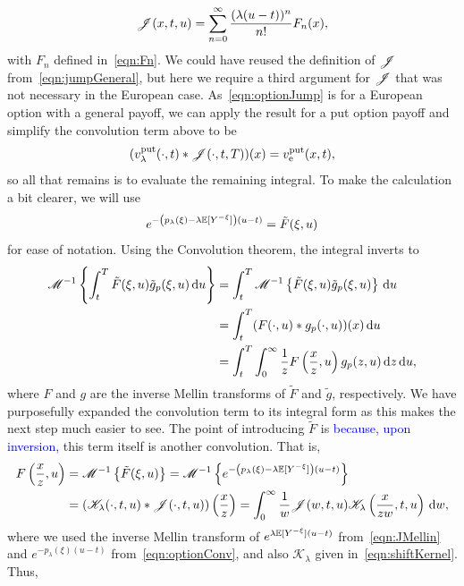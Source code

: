       \begin{equation}
      		\label{eqn:Jnew}
        \mathscr J(x,t,u) = \sum\limits_{n=0}^\infty \frac{(\lambda(u-t))^n}{n!}F_n(x),
      \end{equation}
    with $F_n$ defined in~\eqref{eqn:Fn}. We could have reused the definition of $\mathscr J$ from~\eqref{eqn:jumpGeneral}, but here we require a third argument for $\mathscr J$ that was not necessary in the European case.
    As~\eqref{eqn:optionJump} is for a European option with a general payoff, we can apply the result for a put option payoff and simplify the convolution term above to be
      $$
        (v_\lambda^{\text{put}}(\cdot,t) \ast \mathscr J(\cdot, t, T))(x) = v_{\text{e}}^{\text{put}}(x,t),
      $$
    so all that remains is to evaluate the remaining integral. To make the calculation a bit clearer, we will use
    	$$
    		e^{-\left(p_\lambda(\xi) -\lambda\mathbb E[Y^{-\xi}]\right)(u-t)} = \tilde{F}(\xi,u)
    	$$
    	for ease of notation. Using the Convolution theorem, the integral inverts to
      \begin{align*}
          \mathscr M^{-1}\left\{ \int_t^T \tilde{F}(\xi,u)\tilde{g}_p(\xi,u) \, \mathrm d u \right\} &=
          \int_t^T \mathscr M^{-1}\left\{\tilde{F}(\xi,u)\tilde{g}_p(\xi,u)\right\} \,\mathrm d u \\
          &= \int_t^T (F(\cdot,u)\ast g_p(\cdot,u))(x) \, \mathrm d u \\
          &= \int_t^T \int_0^\infty \frac{1}{z}F\left(\frac{x}{z},u\right)g_p(z,u) \, \mathrm d z \, \mathrm d u,
        \end{align*}
        where $F$ and $g$ are the inverse Mellin transforms of $\tilde F$ and $\tilde g$, respectively. We have purposefully expanded the convolution term to its integral form as this makes the next step much easier to see. The point of introducing $\tilde F$ is \textcolor{blue}{because, upon inversion,} this term itself is another convolution. That is,
        \begin{align*}
        	F\left(\frac{x}{z},u\right) &= \mathscr M^{-1}\left\{\tilde{F}(\xi,u)\right\} = \mathscr M^{-1}\left\{e^{-\left(p_\lambda(\xi) -\lambda\mathbb E[Y^{-\xi}]\right)(u-t)}\right\} \\
        	&= (\mathscr K_\lambda(\cdot,t,u)\ast \mathscr J(\cdot,t,u))\left(\frac{x}{z}\right) = \int_0^\infty \frac{1}{w}\mathscr J(w,t,u)\mathscr K_\lambda\left( \frac{x}{zw},t,u \right) \, \mathrm d w,
        \end{align*}
        where we used the inverse Mellin transform of $e^{\lambda\mathbb E[Y^{-\xi}](u-t)}$ from~\eqref{eqn:JMellin} and $e^{-p_\lambda(\xi)(u-t)}$ from~\eqref{eqn:optionConv}, and also $\mathscr{K}_\lambda$ given in~\eqref{eqn:shiftKernel}. Thus,
